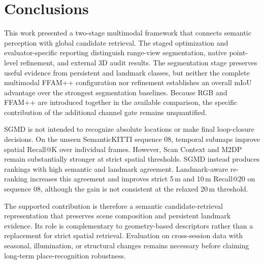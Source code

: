 \section{Conclusions} \label{sec:conclusion}
This work presented a two-stage multimodal framework that connects semantic perception with global candidate retrieval. The staged optimization and evaluator-specific reporting distinguish range-view segmentation, native point-level refinement, and external 3D audit results. The segmentation stage preserves useful evidence from persistent and landmark classes, but neither the complete multimodal FFAM++ configuration nor refinement establishes an overall mIoU advantage over the strongest segmentation baselines. Because RGB and FFAM++ are introduced together in the available comparison, the specific contribution of the additional channel gate remains unquantified.

SGMD is not intended to recognize absolute locations or make final loop-closure decisions. On the unseen SemanticKITTI sequence 08, temporal submaps improve spatial Recall@K over individual frames. However, Scan Context and M2DP remain substantially stronger at strict spatial thresholds. SGMD instead produces rankings with high semantic and landmark agreement. Landmark-aware re-ranking increases this agreement and improves strict 5\,m and 10\,m Recall@20 on sequence 08, although the gain is not consistent at the relaxed 20\,m threshold.

The supported contribution is therefore a semantic candidate-retrieval representation that preserves scene composition and persistent landmark evidence. Its role is complementary to geometry-based descriptors rather than a replacement for strict spatial retrieval. Evaluation on cross-session data with seasonal, illumination, or structural changes remains necessary before claiming long-term place-recognition robustness.
